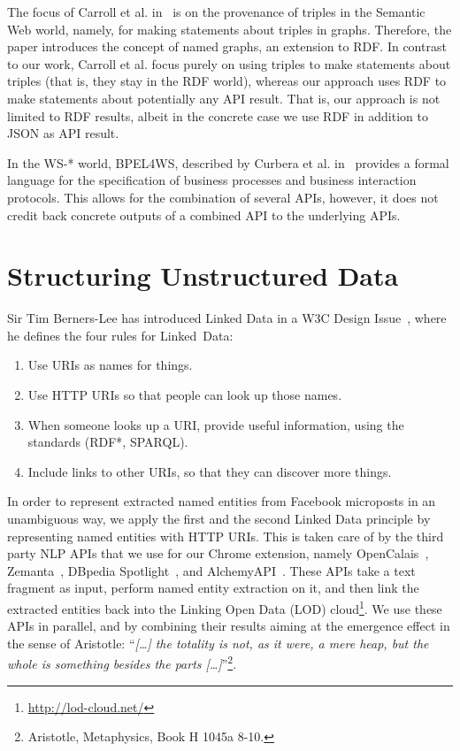 \documentclass[conference]{IEEEtran}
\begin{document}
The focus of Carroll et al. in~\cite{carroll2005} is on the provenance of triples in the Semantic Web world, namely, for making statements about triples in graphs. Therefore, the paper introduces the concept of named graphs, an extension to RDF. In contrast to our work, Carroll et al. focus purely on using triples to make statements about triples (that is, they stay in the RDF world), whereas our approach uses RDF to make statements about potentially any API result. That is, our approach is not limited to RDF results, albeit in the concrete case we use RDF in addition to JSON as API result.
 
In the WS-* world, BPEL4WS, described by Curbera et al. in~\cite{Curbera:2003:NSW:944217.944234} provides a formal language for the specification of business processes and business interaction protocols. This allows for the combination of several APIs, however, it does not credit back concrete outputs of a combined API to the underlying APIs.

\section{Structuring Unstructured Data}    \label{sec:services}
Sir Tim Berners-Lee has introduced Linked Data in a W3C Design Issue~\cite{TimBL:LinkedData}, where he defines the four rules for Linked~Data:
\begin{enumerate}
\item Use URIs as names for things.
\item Use HTTP URIs so that people can look up those names.
\item When someone looks up a URI, provide useful information, using the standards (RDF*, SPARQL).
\item Include links to other URIs, so that they can discover more things.
\end{enumerate}
In order to represent extracted named entities from Facebook microposts in an unambiguous way, we apply the first and the second Linked Data principle by representing named entities with HTTP URIs. This is taken care of by the third party NLP APIs that we use for our Chrome extension, namely OpenCalais~\cite{OpenCalais}, Zemanta~\cite{Zemanta}, DBpedia Spotlight~\cite{Spotlight}, and AlchemyAPI~\cite{AlchemyApi}. These APIs take a text fragment as input, perform named entity extraction on it, and then link the extracted entities back into the Linking Open Data (LOD) cloud\footnote{\url{http://lod-cloud.net/}}. We use these APIs in parallel, and by combining their results aiming at the emergence effect in the sense of Aristotle: ``\emph{[\ldots] the totality is not, as it were, a mere heap, but the whole is something besides the parts [\ldots]}''\footnote{Aristotle, Metaphysics, Book H 1045a 8-10.}. 
\end{document}
